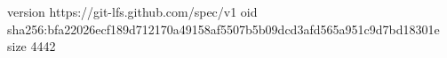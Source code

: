 version https://git-lfs.github.com/spec/v1
oid sha256:bfa22026ecf189d712170a49158af5507b5b09dcd3afd565a951c9d7bd18301e
size 4442
